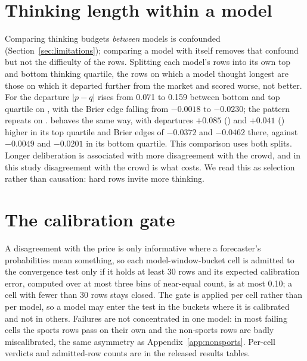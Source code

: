 \section{Thinking length within a model}
\label{app:thinking}
Comparing thinking budgets \emph{between} models is confounded
(Section~\ref{sec:limitations}); comparing a model with itself removes that
confound but not the difficulty of the rows.
Splitting each model's rows into its own top and bottom thinking quartile, the
rows on which a model thought longest are those on which it departed further from
the market and scored worse, not better. For \mGptFiveTwo the departure
$|p-q|$ rises from 0.071 to 0.159 between bottom and top quartile on \winA, with
the Brier edge falling from $-0.0018$ to $-0.0230$; the pattern repeats on \winB.
\mGptFiveFive behaves the same way, with departures $+0.085$ (\winB) and $+0.041$
(\winC) higher in its top quartile and Brier edges of $-0.0372$ and $-0.0462$
there, against $-0.0049$ and $-0.0201$ in its bottom quartile. This comparison
uses both splits. Longer deliberation is associated with more disagreement with the crowd,
and in this study disagreement with the crowd is what costs. We read this as
selection rather than causation: hard rows invite more thinking.

\section{The calibration gate}
\label{app:gate}
A disagreement with the price is only informative where a forecaster's
probabilities mean something, so each model-window-bucket cell is admitted to
the convergence test only if it holds at least 30 rows and its expected calibration error, computed over at most
three bins of near-equal count, is at most 0.10; a cell with fewer than 30 rows
stays closed. The gate is applied per cell rather than per
model, so a model may enter the test in the buckets where it is calibrated and not in
others. Failures are not concentrated in one model: in most failing cells the
sports rows pass on their own and the non-sports rows are badly miscalibrated,
the same
asymmetry as Appendix~\ref{app:nonsports}. Per-cell verdicts
and admitted-row counts are in the released results tables.


